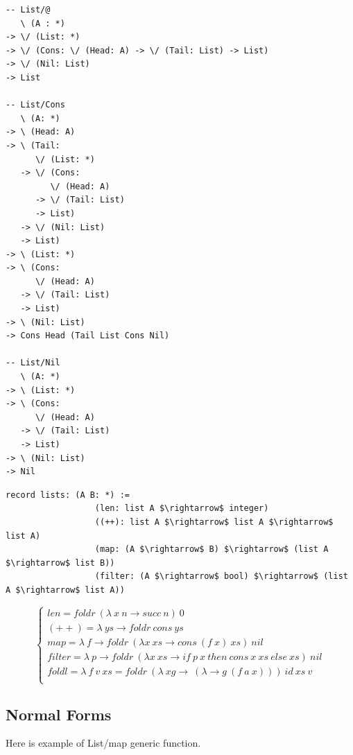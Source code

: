 \documentclass[11pt,oneside]{article}
\begin{document}
\begin{lstlisting}[mathescape=true]
-- List/@
   \ (A : *)
-> \/ (List: *)
-> \/ (Cons: \/ (Head: A) -> \/ (Tail: List) -> List)
-> \/ (Nil: List)
-> List

-- List/Cons
   \ (A: *)
-> \ (Head: A)
-> \ (Tail:
      \/ (List: *)
   -> \/ (Cons:
         \/ (Head: A)
      -> \/ (Tail: List)
      -> List)
   -> \/ (Nil: List)
   -> List)
-> \ (List: *)
-> \ (Cons:
      \/ (Head: A)
   -> \/ (Tail: List)
   -> List)
-> \ (Nil: List)
-> Cons Head (Tail List Cons Nil)

-- List/Nil
   \ (A: *)
-> \ (List: *)
-> \ (Cons:
      \/ (Head: A)
   -> \/ (Tail: List)
   -> List)
-> \ (Nil: List)
-> Nil
\end{lstlisting}

\begin{lstlisting}[mathescape=true]
           record lists: (A B: *) :=
                  (len: list A $\rightarrow$ integer)
                  ((++): list A $\rightarrow$ list A $\rightarrow$ list A)
                  (map: (A $\rightarrow$ B) $\rightarrow$ (list A $\rightarrow$ list B))
                  (filter: (A $\rightarrow$ bool) $\rightarrow$ (list A $\rightarrow$ list A))
\end{lstlisting}
$$
\begin{cases}
len = foldr\ (\lambda\ x\ n \rightarrow succ\ n)\ 0\\
(++) = \lambda\ ys \rightarrow foldr\ cons\ ys\\
map = \lambda\ f \rightarrow foldr\ (\lambda x\ xs \rightarrow cons\ (f\ x)\ xs)\ nil\\
filter = \lambda\ p \rightarrow foldr\ (\lambda x\ xs \rightarrow if\ p\ x\ then\ cons\ x\ xs\ else\ xs)\ nil\\
foldl = \lambda\ f\ v\ xs = foldr\ (\lambda\ xg\rightarrow\ (\lambda \rightarrow g\ (f\ a\ x)))\ id\ xs\ v\\
\end{cases}
$$

\vspace{1cm}
\subsection{Normal Forms}

Here is example of List/map generic function.
\end{document}
